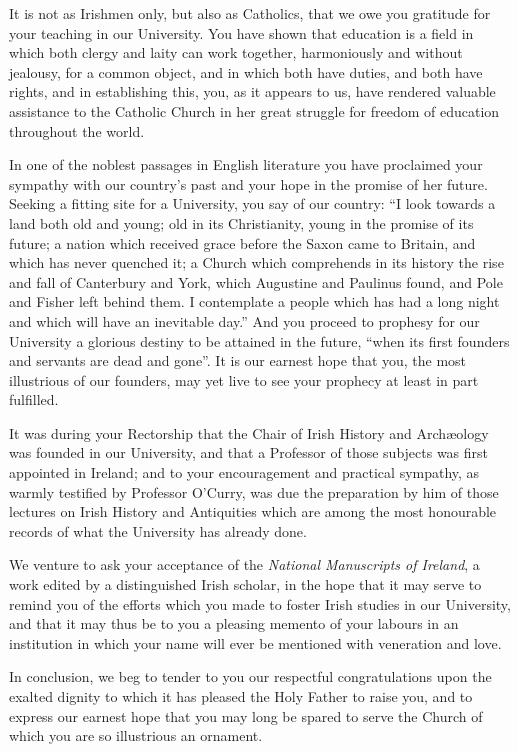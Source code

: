 It is not as Irishmen only, but also as Catholics, that we owe you
gratitude for your teaching in our University. You have shown that
education is a field in which both clergy and laity can work together,
harmoniously and without jealousy, for a common object, and in which
both have duties, and both have rights, and in establishing this, you,
as it appears to us, have rendered valuable assistance to the Catholic
Church in her great struggle for freedom of education throughout the
world.

In one of the noblest passages in English literature you have
proclaimed your sympathy with our country's past and your hope in the
promise of her future. Seeking a fitting site for a University, you
say of our country: ``I look towards a land both old and young;
old in its Christianity, young in the promise of its future; a nation
which received grace before the Saxon came to Britain, and which has
never quenched it; a Church which comprehends in its history the rise
and fall of Canterbury and York, which Augustine and Paulinus found,
and Pole and Fisher left behind them. I contemplate a people
which has had a long night and which will have an inevitable
day.'' And you proceed to prophesy for our University a glorious
destiny to be attained in the future, ``when its first founders
and servants are dead and gone''. It is our earnest hope that you,
the most illustrious of our founders, may yet live to see your
prophecy at least in part fulfilled.

It was during your Rectorship that the Chair of Irish History and
Archæology was founded in our University, and that a Professor of
those subjects was first appointed in Ireland; and to your
encouragement and practical sympathy, as warmly testified by Professor
O'Curry, was due the preparation by him of those lectures on Irish
History and Antiquities which are among the most honourable records of
what the University has already done.

We venture to ask your acceptance of the \emph{National Manuscripts of
Ireland}, a work edited by a distinguished Irish scholar, in the
hope that it may serve to remind you of the efforts which you made to
foster Irish studies in our University, and that it may thus be to you
a pleasing memento of your labours in an institution in which your
name will ever be mentioned with veneration and love.

In conclusion, we beg to tender to you our respectful
congratulations upon the exalted dignity to which it has pleased
the Holy Father to raise you, and to express our earnest hope that you
may long be spared to serve the Church of which you are so illustrious
an ornament.

